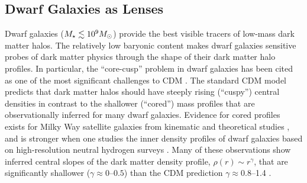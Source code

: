 \subsection{Dwarf Galaxies as Lenses }
\label{sec:halo_profile_group}


Dwarf galaxies ($M_\star \lesssim 10^{9} M_\odot$) provide the best visible tracers of low-mass dark matter halos. 
The relatively low baryonic content makes dwarf galaxies sensitive probes of  dark matter physics through the shape of their dark matter halo profiles. 
In particular, the ``core-cusp'' problem in dwarf galaxies has been cited as one of the most significant challenges to CDM \citep[\eg,][]{2010AdAst2010E...5D,Bullock:2017xww}.
The standard CDM model predicts that dark matter halos should have steeply rising (``cuspy'') central densities in contrast to the shallower (``cored'') mass profiles that are observationally inferred for many dwarf galaxies.  
Evidence for cored profiles exists for Milky Way satellite galaxies from kinematic and theoretical studies \citep[\eg][]{Walker:2009, 2012ApJ...759L..42P}, and is stronger when one studies the inner density profiles of dwarf galaxies based on high-resolution neutral hydrogen surveys \citep[\eg][]{Begum:2008,Hunter:2012,Cannon:2011,Oh:2015}. 
Many of these observations show inferred central slopes of the dark matter density profile, $\rho(r) \sim r^{\gamma}$, that are significantly shallower ($\gamma \approx 0$--$0.5$) than the CDM prediction $\gamma \approx 0.8$--1.4 \citep{Navarro:2010}.

